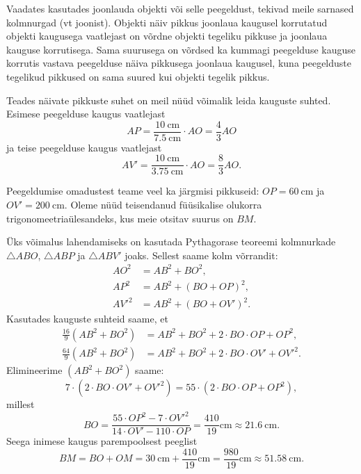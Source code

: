 Vaadates kasutades joonlauda objekti või selle peegeldust, tekivad meile sarnased kolmnurgad (vt joonist). Objekti näiv pikkus joonlaua kaugusel korrutatud objekti kaugusega vaatlejast on võrdne objekti tegeliku pikkuse ja joonlaua kauguse korrutisega. Sama suurusega on võrdsed ka kummagi peegelduse kauguse korrutis vastava peegelduse näiva pikkusega joonlaua kaugusel, kuna peegelduste tegelikud pikkused on sama suured kui objekti tegelik pikkus.
\begin{center}
\end{center}

Teades näivate pikkuste suhet on meil nüüd võimalik leida kauguste suhted. Esimese peegelduse kaugus vaatlejast
\[
  AP = \frac{\SI{10}{\cm}}{\SI{7.5}{\cm}} \cdot AO = \frac{4}{3} AO
\]
ja teise peegelduse kaugus vaatlejast
\[
  AV' = \frac{\SI{10}{\cm}}{\SI{3.75}{\cm}} \cdot AO = \frac{8}{3} AO.
\]

Peegeldumise omadustest teame veel ka järgmisi pikkuseid: $OP = \SI{60}{\cm}$ ja $OV' = \SI{200}{\cm}$. Oleme nüüd teisendanud füüsikalise olukorra trigonomeetriaülesandeks, kus meie otsitav suurus on $BM$.

Üks võimalus lahendamiseks on kasutada Pythagorase teoreemi kolmnurkade $\triangle ABO$, $\triangle ABP$ ja $\triangle ABV'$ joaks. Sellest saame kolm võrrandit:
\begin{align*}
  AO^2 &= AB^2 + BO^2,\\
  AP^2 &= AB^2 + (BO + OP)^2,\\
  AV'^2 &= AB^2 + (BO + OV')^2.
\end{align*}
Kasutades kauguste suhteid saame, et
\begin{align*}
  \frac{16}{9} (AB^2 + BO^2) &= AB^2 + BO^2 + 2 \cdot BO \cdot OP + OP^2,\\
  \frac{64}{9} (AB^2 + BO^2) &= AB^2 + BO^2 + 2 \cdot BO \cdot OV' + OV'^2.
\end{align*}
Elimineerime $(AB^2 + BO^2)$ saame:
\[
  7 \cdot ( 2 \cdot BO \cdot OV' + OV'^2) = 55 \cdot (2 \cdot BO \cdot OP + OP^2),
\]
millest
\[
  BO = \frac{55 \cdot OP^2 - 7 \cdot OV'^2}{14 \cdot OV' - 110 \cdot OP} = \frac{410}{19} \si{\cm} \approx \SI{21.6}{\cm}.
\]
Seega inimese kaugus parempoolsest peeglist
\[
  BM = BO + OM = \SI{30}{\cm} + \frac{410}{19} \si{\cm} = \frac{980}{19} \si{\cm} \approx \SI{51.58}{\cm}.
\]
\probend